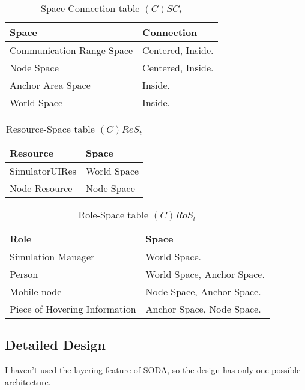 \begin{table}[H]
	\centering
	\begin{tabular}{|p{4cm}|p{8cm}|}
			\hline
			\textbf{Space} & \textbf{Connection} \\
			\hline
			Communication Range Space & Centered, Inside. \\
			\hline
			Node Space & Centered, Inside. \\
			\hline
			Anchor Area Space & Inside. \\
			\hline
			World Space & Inside. \\
			\hline
		\end{tabular}
	\caption{Space-Connection table $(C)SC_t$}
	\label{tab:sct}
\end{table}

\begin{table}[H]
	\centering
	\begin{tabular}{|p{4cm}|p{8cm}|}
			\hline
			\textbf{Resource} & \textbf{Space} \\
			\hline
			SimulatorUIRes & World Space \\
			\hline
			Node Resource & Node Space \\
			\hline
		\end{tabular}
	\caption{Resource-Space table $(C)ReS_t$}
	\label{tab:crest}
\end{table}

\begin{table}[H]
	\centering
	\begin{tabular}{|p{4cm}|p{8cm}|}
			\hline
			\textbf{Role} & \textbf{Space} \\
			\hline
			Simulation Manager & World Space. \\
			\hline
			Person & World Space, Anchor Space. \\
			\hline
			Mobile node & Node Space, Anchor Space. \\
			\hline
			Piece of Hovering Information & Anchor Space, Node Space. \\
			\hline
		\end{tabular}
	\caption{Role-Space table $(C)RoS_t$}
	\label{tab:cost}
\end{table}

\subsection{Detailed Design}

I haven't used the layering feature of SODA, so the design has only one
possible architecture.

